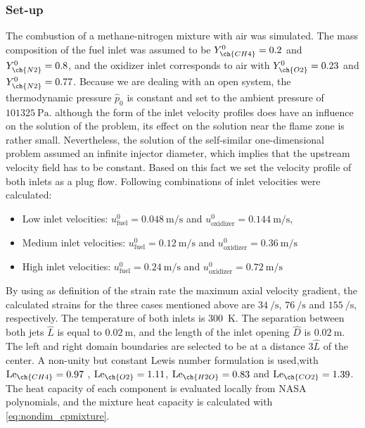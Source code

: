 \subsubsection{Set-up}
The combustion of a methane-nitrogen mixture with air was simulated. The mass composition of the fuel inlet was assumed to be  $Y^0_{\ch{CH4}} = 0.2$ and $Y^0_{\ch{N2}} = 0.8$, and the oxidizer inlet corresponds to air with   $Y^0_{\ch{O2}} = 0.23$ and $Y^0_{\ch{N2}} = 0.77$. Because we are dealing with an open system, the thermodynamic pressure $\hat p_0$ is constant and set to the ambient pressure of $\SI{101325}{\pascal}$. 
 although the form of the inlet velocity profiles does have an influence on the solution of the problem, its effect on the solution near the flame zone is rather small. Nevertheless, the solution of the self-similar one-dimensional problem assumed an infinite injector diameter, which implies that the upstream velocity field has to be constant. Based on this fact we set the velocity profile of both inlets as a plug flow. Following combinations of inlet velocities were calculated:
\begin{itemize}
	\item  Low inlet velocities:  $u^0_{\text{fuel}} = \SI{0.048}{\meter \per \second}$ and  $u^0_{\text{oxidizer}} = \SI{0.144}{\meter \per \second}$,
	\item Medium inlet velocities:  $u^0_{\text{fuel}} = \SI{0.12}{\meter \per \second}$ and  $u^0_{\text{oxidizer}} = \SI{0.36}{\meter \per \second}$
	\item High inlet velocities: $u^0_{\text{fuel}}  = \SI{0.24}{\meter \per \second}$ and   $u^0_{\text{oxidizer}} = \SI{0.72}{\meter \per \second}$
\end{itemize}
By using as definition of the strain rate the maximum axial velocity gradient, the calculated strains for the three cases mentioned above are $\SI{34}{\per\second}$, $\SI{76}{\per\second}$ and $\SI{155}{\per\second}$, respectively. The temperature of both inlets is \SI{300}{\kelvin}. The separation between both jets $\hat L$ is equal to $\SI{0.02}{\meter}$, and the length of the inlet opening $\hat D$ is $\SI{0.02}{\meter}$. The left and right domain boundaries are selected to be at a distance $3\hat L$ of the center. A non-unity but constant Lewis number formulation is used,with
$\Lewis_{\ch{CH4}} =  0.97 $ , $\Lewis_{\ch{O2}} = 1.11 $, $\Lewis_{\ch{H2O}} = 0.83 $ and $\Lewis_{\ch{CO2}} = 1.39 $.\cite{smookePremixedNonpremixedTest1991} The heat capacity of each component is evaluated locally from NASA polynomials, and the mixture heat capacity is calculated with \cref{eq:nondim_cpmixture}.
